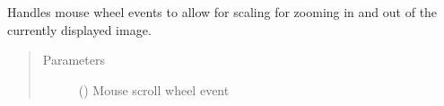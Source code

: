 \documentclass[letterpaper,10pt,english]{sphinxmanual}
\begin{document}
\begin{fulllineitems}
\begin{fulllineitems}
\end{fulllineitems}


\begin{fulllineitems}
\label{\detokenize{polo.widgets:polo.widgets.slideshow_viewer.PhotoViewer.wheelEvent}}
Handles mouse wheel events to allow for scaling for zooming in and
out of the currently displayed image.
\begin{quote}\begin{description}
\item[{Parameters}] \leavevmode
{} () \textendash{} Mouse scroll wheel event

\end{description}\end{quote}

\end{fulllineitems}


\end{fulllineitems}

\end{document}
